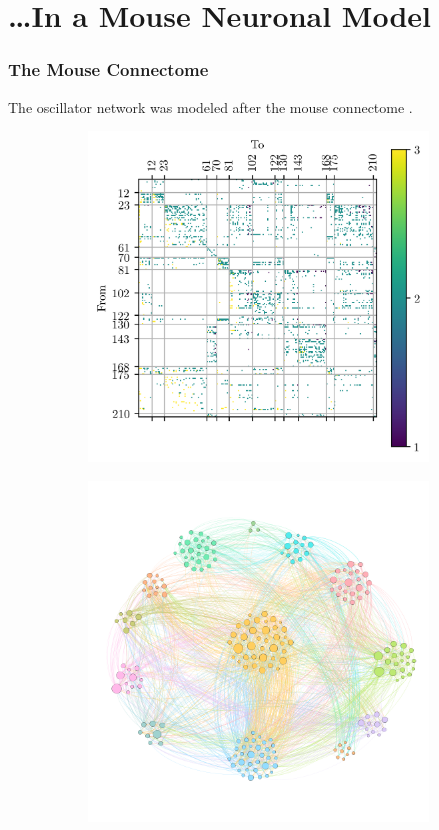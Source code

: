 \documentclass[hyperref={hidelinks}]{beamer}
\begin{document}
\section{\ldots In a Mouse Neuronal Model}
\begin{frame}
  \frametitle{The Mouse Connectome}
  The oscillator network was modeled after the mouse connectome \cite{Oh2014}.
  \begin{figure}
    \centering
    \begin{subfigure}{0.49\textwidth}
      \centering
      \includegraphics[width=0.99\textwidth]{figure/n}
      \caption{}
      \label{fig:connectome_matrix}
    \end{subfigure}%
    \begin{subfigure}{0.49\textwidth}
      \centering
      \includegraphics[width=0.99\textwidth]{figure/network}

\end{subfigure}
\end{figure}
\end{frame}
\end{document}
